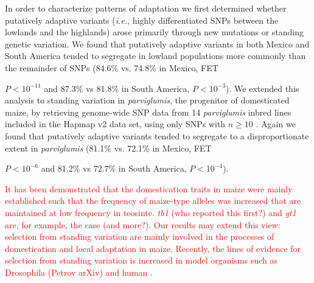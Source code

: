In order to characterize patterns of adaptation we first determined whether putatively adaptive variants (\emph{i.e.}, highly differentiated SNPs between the lowlands and the highlands) arose primarily through new mutations or standing genetic variation.  
We found that putatively adaptive variants in both Mexico and South America tended to segregate in lowland populations more commonly than the remainder of SNPs (84.6\% vs. 74.8\% in Mexico, FET {$P < 10^{-11}$ and 87.3\% vs 81.8\% in South America,  $P< 10^{-3}$).  
We extended this analysis to standing variation in \emph{parviglumis}, the progenitor of domesticated maize, by retrieving genome-wide SNP data from 14 \emph{parviglumis} inbred lines included in the Hapmap v2 data set, using only SNPs with $n\geq10$ \cite[]{Hufford_2012_22660546}.  Again we found that putatively adaptive variants tended to segregate to a disproportionate extent in \emph{parviglumis} (81.1\% vs. 72.1\% in Mexico, FET {$P < 10^{-6}$ and 81.2\% vs 72.7\% in South America,  $P< 10^{-4}$).   

\textcolor{red}{It has been demonstrated that the domestication traits in maize were mainly established such that the frequency of maize-type alleles was increased that are maintained at low frequency in teosinte.  \emph{tb1} (who reported this first?) and \emph{gt1} \cite[]{Wills2013} are, for example, the case (and more?).  Our results may extend this view: selection from standing variation are mainly involved in the processes of domestication and local adaptation in maize.  
Recently, the lines of evidence for selection from standing variation is increased in model organisms such as Drosophila (Petrov arXiv) and human \cite[]{Turchin_2012_22902787,Peter_2012_23071458}.}



}}
